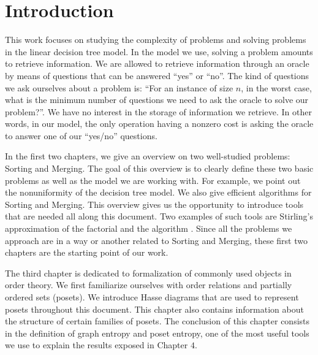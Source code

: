 \chapter*{Introduction}

This work focuses on studying the complexity of problems and solving problems
in the linear decision tree model. In the model we use, solving a problem
amounts to retrieve information. We are allowed to retrieve information
through an oracle by means of questions that
can be answered ``yes'' or ``no''. The kind of questions we ask ourselves
about a problem is: ``For an instance of size \(n\), in the worst case, what is
the minimum number of questions we need to ask the oracle to solve our
problem?''. We have no interest in the storage of information we retrieve.
In other words, in our model, the only operation having a nonzero cost is
asking the oracle to answer one of our ``yes/no'' questions.

In the first two chapters, we give an overview on two well-studied problems:
Sorting and Merging. The goal of this overview is to clearly define these two
basic problems as well as the model we are working with. For example, we point
out the nonuniformity of the decision tree model.
We also give efficient algorithms for Sorting and Merging.
This overview gives us
the opportunity to introduce tools that are needed all along this document. Two
examples of such tools are Stirling's approximation of the factorial
\cite{feller1967direct} and the \mergesort algorithm
\cite{goldstine:1948,leiserson:2001}. Since all the problems we approach are in
a way or another related to Sorting and Merging, these first two chapters are the starting
point of our work.

The third chapter is dedicated to formalization of commonly used objects
in order theory. We first familiarize ourselves with order
relations and partially ordered sets (posets). We introduce Hasse diagrams that
are used to represent posets throughout this document.
This chapter also contains information about the structure of
certain families of posets. The conclusion of this
chapter consists in the definition of graph entropy \cite{korner1973coding}
and poset entropy, one of the most useful tools we use to explain the
results exposed in Chapter \(4\).

